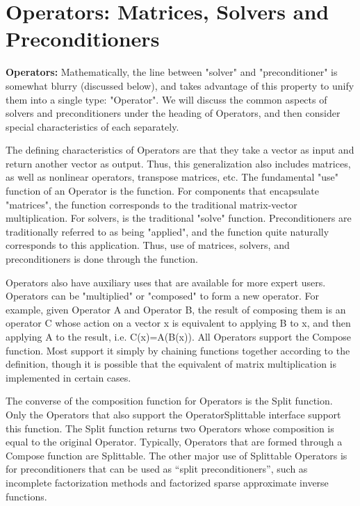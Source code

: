 
\chapter{Operators: Matrices, Solvers and Preconditioners}

{\bf Operators:} Mathematically, the line between "solver" and "preconditioner" is
somewhat blurry (discussed 
below), and \hypre{} takes advantage of this property
to unify them into a single type: "Operator".
We will discuss the common aspects of
solvers and preconditioners under the heading of Operators,
and then consider special characteristics of each separately.

The defining characteristics of Operators are that they take a vector as input
and return another vector as 
output. Thus, this generalization also includes matrices, as well as nonlinear
operators, transpose matrices, 
etc. 
The fundamental "use" function of an Operator is the  function. For
components that 
encapsulate "matrices", the  function corresponds to the traditional
matrix-vector multiplication. For 
solvers,  is the traditional "solve" function. 
Preconditioners are traditionally
referred to as being "applied", 
and the  function quite naturally corresponds to this application. 
Thus,
use of matrices, solvers, and 
preconditioners is done through the  function.

Operators also have auxiliary uses that are available for more
expert users.
Operators can be "multiplied" or "composed" to form a new operator.
For example, given Operator A and Operator B, the result of composing
them is an operator C whose action on a vector x is equivalent to
applying B to x, and then applying A to the result, i.e. C(x)=A(B(x)).
All Operators support the Compose function. 
Most support it simply by chaining  functions together according
to the definition, though it is possible that the equivalent of matrix 
multiplication is implemented in certain cases.

The converse of the composition function for Operators is the Split function.
Only the Operators that also support the OperatorSplittable interface support
this function.
The Split function returns two Operators whose composition is equal to 
the original Operator.
Typically, Operators that are formed through a Compose function are Splittable.
The other major use of Splittable Operators is for preconditioners that can be 
used as ``split preconditioners'', such as incomplete factorization methods and
factorized sparse approximate inverse functions.

